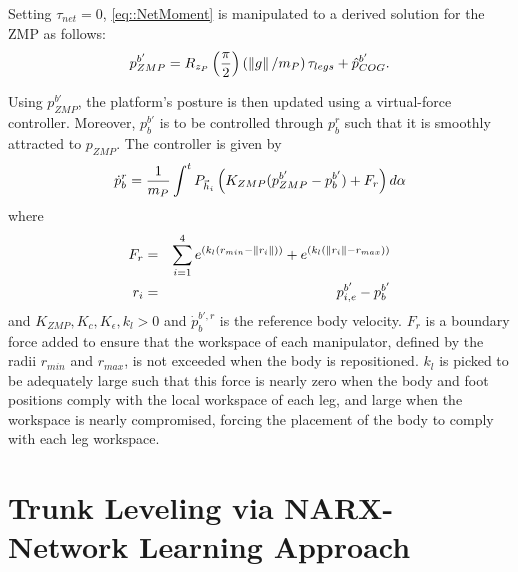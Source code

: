 		Setting $\tau_{net}=0$, \ref{eq::NetMoment} is manipulated to a derived solution for the ZMP as follows:
			\begin{equation}
				{p}_{ZMP}^{b'} = R_{z_P} \left(\frac{\pi}{2}\right)  \left( \left\lVert g\right\rVert/m_{P}\right) \tau_{legs} + \hat{p}_{COG}^{b'}.
				\label{eq::ZMPFromMoment}
			\end{equation}

		Using ${p}_{ZMP}^{b'}$, the platform's posture is then updated using a virtual-force controller. Moreover, ${p}_{b}^{b'}$ is to be controlled through  ${p}_{b}^{r}$ such that it is smoothly attracted to ${p}_{ZMP}$. The controller is given by
			\begin{equation}
				\dot{p}_{b}^{r} 	= \frac{1}{m_{P}} \int^{t} {P}_{\vec{h}_{i}} \left(K_{ZMP}	( {p}_{ZMP}^{b'} - {p}_{b}^{b'} )  
				+ F_{r} \right) d\alpha
				\label{eq::ZMPController}
			\end{equation}	
		where
			\begin{eqnarray*}
				F_{r} 	& = &  \sum_{i=1}^{4}  e^{\left( k_{l} \left(r_{min} -  \left\lVert r_{i}\right\rVert \right) \right) } + e^{ \left( k_{l} \left( \left\lVert r_{i} \right\rVert - r_{max} \right) \right) } \nonumber \\
				r_{i}	& = & {p}_{i,e}^{b'}- {p}_{b}^{b'} \nonumber
			\end{eqnarray*}
		and $K_{ZMP}, K_{c}, K_{\epsilon}, k_{l} > 0$ and $\dot{p}_{b}^{b',r}$ is the reference body velocity. $F_{r}$ is a boundary force added to ensure that the workspace of each manipulator, defined by the radii $r_{min}$ and $r_{max}$, is not exceeded when the body is repositioned. $k_{l}$ is picked to be adequately large such that this force is nearly zero when the body and foot positions comply with the local workspace of each leg, and large when the workspace is nearly compromised, forcing the placement of the body to comply with each leg workspace.





	\section{Trunk Leveling via NARX-Network Learning Approach}

